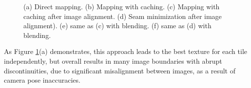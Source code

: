 \documentclass[]{spie}  %
\begin{document}
\begin{figure}[h!]
  \centering {}

  \centering {}

  \centering {}

  \centering {}

  \centering {}

  \centering {}
  \caption{(a) Direct mapping. (b) Mapping with caching. (c) Mapping
    with caching after image alignment. (d) Seam minimization after
    image alignment). (e) same as (c) with blending. (f) same as (d)
    with blending.}
  \label{fig:compareAll}
\end{figure}


As Figure \ref{fig:compareAll}(a) demonstrates, this approach leads to
the best texture for each tile independently, but overall results in
many image boundaries with abrupt discontinuities, due to significant
misalignment between images, as a result of camera pose inaccuracies.



\end{document}
